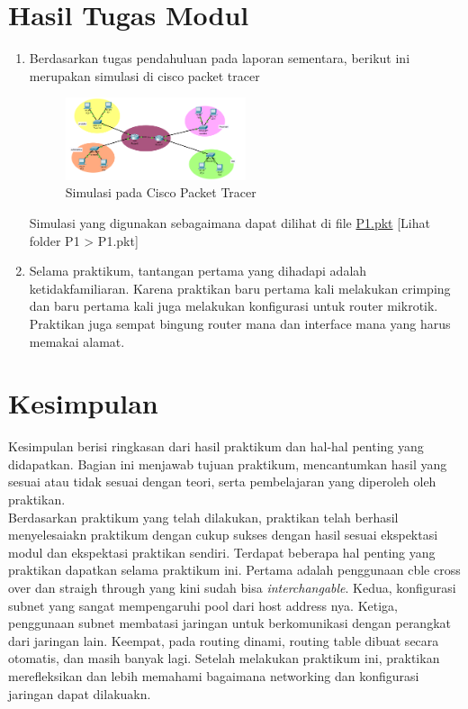 \section{Hasil Tugas Modul}
\begin{enumerate}
  \item Berdasarkan tugas pendahuluan pada laporan sementara, berikut ini merupakan simulasi di cisco packet tracer \\
  	\begin{figure}[H] 
    \centering
    \includegraphics[width=0.5\textwidth]{P1/img/tupen3.png}
    \caption{Simulasi pada Cisco Packet Tracer}
    \label{fig: Simulasi pada Cisco Packet Tracer}
	\end{figure}
  Simulasi yang digunakan sebagaimana dapat dilihat di file \href{run:P1.pkt}{P1.pkt} [Lihat folder P1 > P1.pkt]
  \item 
  Selama praktikum, tantangan pertama  yang dihadapi adalah ketidakfamiliaran. Karena praktikan baru pertama kali melakukan crimping dan baru pertama kali juga melakukan konfigurasi untuk router mikrotik. Praktikan juga sempat bingung router mana dan interface mana yang harus memakai alamat.
\end{enumerate}

\section{Kesimpulan}
Kesimpulan berisi ringkasan dari hasil praktikum dan hal-hal penting yang didapatkan. Bagian ini menjawab tujuan praktikum, mencantumkan hasil yang sesuai atau tidak sesuai dengan teori, serta pembelajaran yang diperoleh oleh praktikan.\\
Berdasarkan praktikum yang telah dilakukan, praktikan telah berhasil menyelesaiakn praktikum dengan cukup sukses dengan hasil sesuai ekspektasi modul dan ekspektasi praktikan sendiri. Terdapat beberapa hal penting yang praktikan dapatkan selama praktikum ini. Pertama adalah penggunaan cble cross over dan straigh through yang kini sudah bisa \textit{interchangable}. Kedua, konfigurasi subnet yang sangat mempengaruhi pool dari host address nya. Ketiga, penggunaan subnet membatasi jaringan untuk berkomunikasi dengan perangkat dari jaringan lain. Keempat, pada routing dinami, routing table dibuat secara otomatis, dan masih banyak lagi. Setelah melakukan praktikum ini, praktikan merefleksikan dan lebih memahami bagaimana networking dan konfigurasi jaringan dapat dilakuakn.

